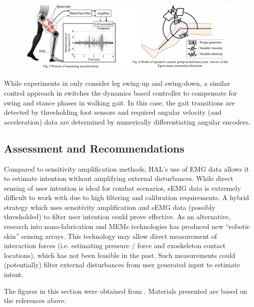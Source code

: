 \begin{refsection}
%
\begin{figure}[ht]
  \centering
  \includegraphics[width=6in]{exos/figs/hal_viscoelastic_control.png}
\end{figure}
%
%

While experiments in \cite{HALmuscleImped2005} only consider leg swing-up and swing-down, a similar control approach in \cite{HALvTorqueImp2002} switches the dynamics based controller to compensate for swing and stance phases in walking gait.  In this case, the gait transitions are detected by thresholding foot sensors and required angular velocity (and acceleration) data are determined by numerically differentiating angular encoders.


\subsection{Assessment and Recommendations}

Compared to sensitivity amplification methods, HAL's use of EMG data allows it to estimate intention without amplifying external disturbances.  While direct sensing of user intention is ideal for combat scenarios, sEMG data is extremely difficult to work with due to high filtering and calibration requirements.  A hybrid strategy which uses sensitivity amplification and sEMG data (possibly thresholded) to filter user intention could prove effective.  As an alternative, research into nano-fabrication and MEMs technologies has produced new ``robotic skin'' sensing arrays. This technology may allow direct measurement of interaction forces (i.e. estimating pressure / force and exoskeleton contact locations), which has not been feasible in the past.  Such measurements could (potentially) filter external disturbances from user generated input to estimate intent.

\nocite{*}
\printbibliography[heading=subbibliography]

The figures in this section were obtained from \cite{HALmuscleImped2005,HALassist2011}.  Materials presented are based on the references above.

\end{refsection}



